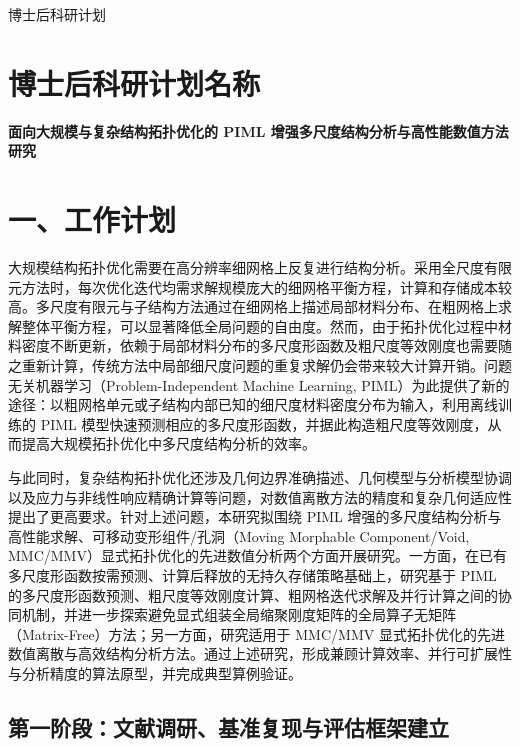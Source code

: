 \documentclass[zihao=-4,a4paper]{ctexart}
\begin{document}
\begin{center}
	{\heiti{} 博士后科研计划}
\end{center}

\vspace{0.5em}

\section*{博士后科研计划名称}

\textbf{面向大规模与复杂结构拓扑优化的 PIML 增强多尺度结构分析与高性能数值方法研究}

\section*{一、工作计划}

大规模结构拓扑优化需要在高分辨率细网格上反复进行结构分析。采用全尺度有限元方法时，每次优化迭代均需求解规模庞大的细网格平衡方程，计算和存储成本较高。多尺度有限元与子结构方法通过在细网格上描述局部材料分布、在粗网格上求解整体平衡方程，可以显著降低全局问题的自由度。然而，由于拓扑优化过程中材料密度不断更新，依赖于局部材料分布的多尺度形函数及粗尺度等效刚度也需要随之重新计算，传统方法中局部细尺度问题的重复求解仍会带来较大计算开销。问题无关机器学习（Problem-Independent Machine Learning, PIML）为此提供了新的途径：以粗网格单元或子结构内部已知的细尺度材料密度分布为输入，利用离线训练的 PIML 模型快速预测相应的多尺度形函数，并据此构造粗尺度等效刚度，从而提高大规模拓扑优化中多尺度结构分析的效率。

与此同时，复杂结构拓扑优化还涉及几何边界准确描述、几何模型与分析模型协调以及应力与非线性响应精确计算等问题，对数值离散方法的精度和复杂几何适应性提出了更高要求。针对上述问题，本研究拟围绕 PIML 增强的多尺度结构分析与高性能求解、可移动变形组件/孔洞（Moving Morphable Component/Void, MMC/MMV）显式拓扑优化的先进数值分析两个方面开展研究。一方面，在已有多尺度形函数按需预测、计算后释放的无持久存储策略基础上，研究基于 PIML 的多尺度形函数预测、粗尺度等效刚度计算、粗网格迭代求解及并行计算之间的协同机制，并进一步探索避免显式组装全局缩聚刚度矩阵的全局算子无矩阵（Matrix-Free）方法；另一方面，研究适用于 MMC/MMV 显式拓扑优化的先进数值离散与高效结构分析方法。通过上述研究，形成兼顾计算效率、并行可扩展性与分析精度的算法原型，并完成典型算例验证。

\subsection*{第一阶段：文献调研、基准复现与评估框架建立}
\end{document}
